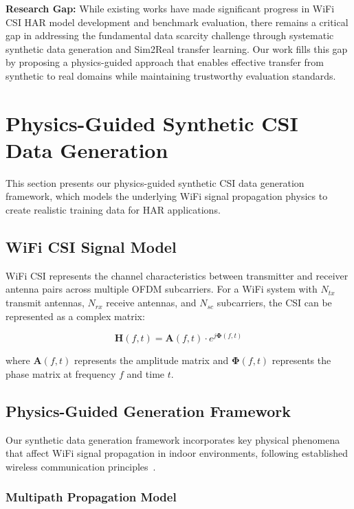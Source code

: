 \documentclass[journal]{IEEEtran}
\begin{document}
\textbf{Research Gap:} While existing works have made significant progress in WiFi CSI HAR model development and benchmark evaluation, there remains a critical gap in addressing the fundamental data scarcity challenge through systematic synthetic data generation and Sim2Real transfer learning. Our work fills this gap by proposing a physics-guided approach that enables effective transfer from synthetic to real domains while maintaining trustworthy evaluation standards.

\section{Physics-Guided Synthetic CSI Data Generation}

This section presents our physics-guided synthetic CSI data generation framework, which models the underlying WiFi signal propagation physics to create realistic training data for HAR applications.

\subsection{WiFi CSI Signal Model}

WiFi CSI represents the channel characteristics between transmitter and receiver antenna pairs across multiple OFDM subcarriers. For a WiFi system with $N_{tx}$ transmit antennas, $N_{rx}$ receive antennas, and $N_{sc}$ subcarriers, the CSI can be represented as a complex matrix:

\begin{equation}
\mathbf{H}(f,t) = \mathbf{A}(f,t) \cdot e^{j\boldsymbol{\Phi}(f,t)}
\end{equation}

where $\mathbf{A}(f,t)$ represents the amplitude matrix and $\boldsymbol{\Phi}(f,t)$ represents the phase matrix at frequency $f$ and time $t$.

\subsection{Physics-Guided Generation Framework}

Our synthetic data generation framework incorporates key physical phenomena that affect WiFi signal propagation in indoor environments, following established wireless communication principles~\cite{goldsmith2005wireless}.

\subsubsection{Multipath Propagation Model}
\end{document}

